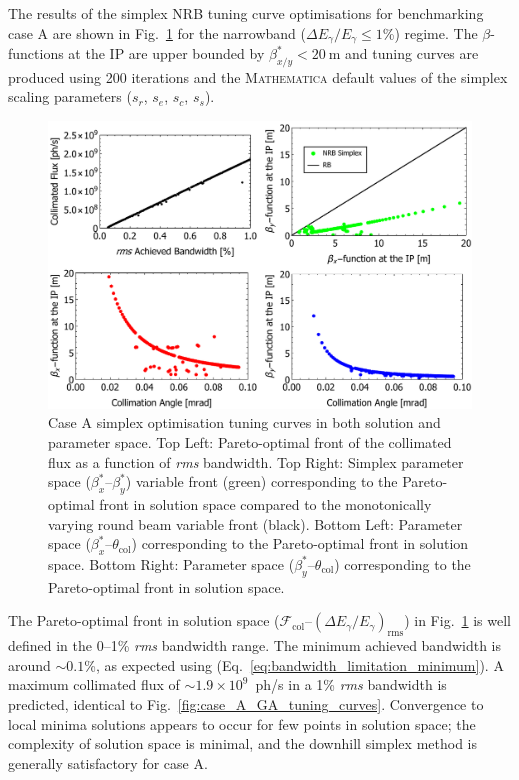 \documentclass[../main.tex]{subfiles}
\begin{document}
The results of the simplex NRB tuning curve optimisations for benchmarking case A are shown in Fig.~\ref{fig:case_A_simplex_tuning_curves} for the narrowband ($\Delta E_{\gamma}/E_{\gamma} \leq1$\%) regime. The $\beta$-functions at the IP are upper bounded by $\beta_{x/y}^{*} < 20~\mathrm{\si{\meter}}$ and tuning curves are produced using 200 iterations and the \textsc{Mathematica} \cite{wolfram2021nmaximize} default values of the simplex scaling parameters ($s_{r}$, $s_{e}$, $s_{c}$, $s_{s}$). 
\begin{figure}[!h]
\centering
\includegraphics[width=\textwidth]{Figures/Optimisation_and_Characterisation_of_Inverse_Compton_Scattering_Sources/Case_A_simplex_Tuning_Curves.pdf}
\caption{Case A simplex optimisation tuning curves in both solution and parameter space. Top Left: Pareto-optimal front of the collimated flux as a function of \textit{rms} bandwidth. Top Right: Simplex parameter space ($\beta_{x}^{*}$--$\beta_{y}^{*}$) variable front (green) corresponding to the Pareto-optimal front in solution space compared to the monotonically varying round beam variable front (black). Bottom Left: Parameter space ($\beta_{x}^{*}$--$\theta_{\mathrm{col}}$) corresponding to the Pareto-optimal front in solution space. Bottom Right: Parameter space ($\beta_{y}^{*}$--$\theta_{\mathrm{col}}$) corresponding to the Pareto-optimal front in solution space.}
\label{fig:case_A_simplex_tuning_curves}
\end{figure}

The Pareto-optimal front in solution space ($\mathcal{F}_{\mathrm{col}}$--$\left(\Delta E_{\gamma}/E_{\gamma}\right)_{\mathrm{rms}}$) in Fig.~\ref{fig:case_A_simplex_tuning_curves} is well defined in the 0--1\% \textit{rms} bandwidth range. The minimum achieved bandwidth is around $\sim0.1$\%, as expected using (Eq.~\ref{eq:bandwidth_limitation_minimum}). A maximum collimated flux of $\sim 1.9\times 10^{9}$~ph/\si{\second} in a 1\% \textit{rms} bandwidth is predicted, identical to Fig.~\ref{fig:case_A_GA_tuning_curves}. Convergence to local minima solutions appears to occur for few points in solution space; the complexity of solution space is minimal, and the downhill simplex method is generally satisfactory for case A.  
\end{document}
